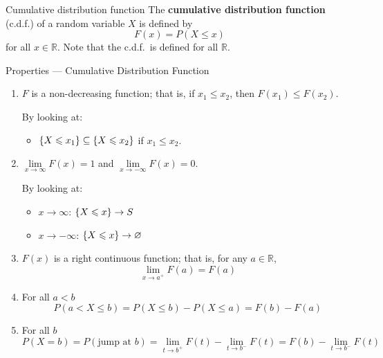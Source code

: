 \begin{Definition}{Cumulative distribution function}{}
    The \textbf{cumulative distribution function} (c.d.f.) of a random variable
    $ X $ is defined by
    \[ F(x)=P(X\leqslant x) \]
    for all $ x\in\mathbb{R} $. Note that the c.d.f.\ is defined for all $ \mathbb{R} $.
\end{Definition}

\begin{Definition}{Properties --- Cumulative Distribution Function}{}
    \begin{enumerate}[label=(\arabic*)]
        \item $ F $ is a non-decreasing function; that is, if $ x_1\leqslant x_2 $,
              then $ F(x_1)\leqslant F(x_2) $.

              By looking at:
              \begin{itemize}
                  \item $ \{X\leqslant x_1\}\subseteq \{X\leqslant x_2\} $
                        if $ x_1\leqslant x_2 $.
              \end{itemize}
        \item $ \lim\limits_{{x} \to {\infty}} F(x)=1 $
              and $ \lim\limits_{{x} \to {-\infty}} F(x)=0 $.

              By looking at:
              \begin{itemize}
                  \item $ x\to\infty $: $ \{X\leqslant x\}\to S $
                  \item $ x\to-\infty $: $ \{X\leqslant x\}\to \varnothing $
              \end{itemize}
        \item $ F(x) $ is a right continuous function; that is,
              for any $ a\in\mathbb{R} $,
              \[ \lim\limits_{{x} \to {a^+}} F(a)=F(a) \]
        \item For all $ a<b $
              \[ P(a<X\leqslant b)=P(X\leqslant b)-P(X\leqslant a)=F(b)-F(a) \]
        \item For all $ b $
              \[ P(X=b)=P(\text{jump at }b)=\lim\limits_{{t} \to {b^+}} F(t)-
                  \lim\limits_{{t} \to {b^-}} F(t)=F(b)-\lim\limits_{{t} \to {b^-}} F(t) \]
    \end{enumerate}
\end{Definition}
